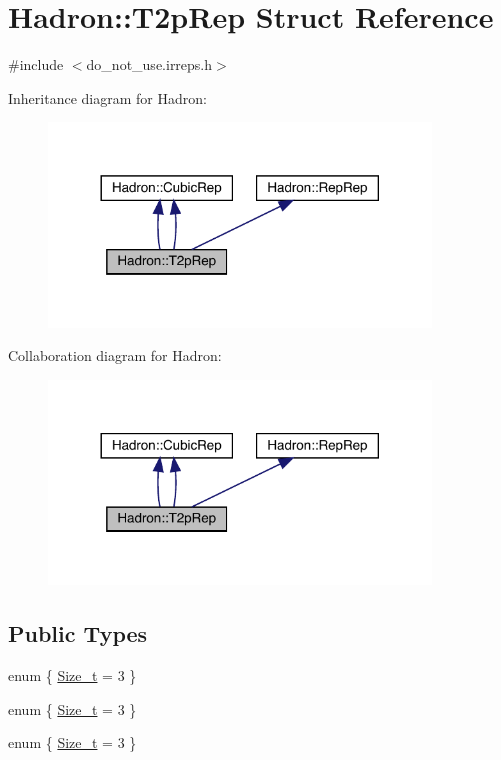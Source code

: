 \hypertarget{structHadron_1_1T2pRep}{}\section{Hadron\+:\+:T2p\+Rep Struct Reference}
\label{structHadron_1_1T2pRep}


{\ttfamily \#include $<$do\+\_\+not\+\_\+use.\+irreps.\+h$>$}



Inheritance diagram for Hadron\+:\nopagebreak
\begin{figure}[H]
\begin{center}
\leavevmode
\includegraphics[width=288pt]{dd/dbd/structHadron_1_1T2pRep__inherit__graph}
\end{center}
\end{figure}


Collaboration diagram for Hadron\+:\nopagebreak
\begin{figure}[H]
\begin{center}
\leavevmode
\includegraphics[width=288pt]{da/d97/structHadron_1_1T2pRep__coll__graph}
\end{center}
\end{figure}
\subsection*{Public Types}
\begin{DoxyCompactItemize}
\item 
enum \{ \mbox{\hyperlink{structHadron_1_1T2pRep_a2df836cd2e8ad1f9c1facd0d3ae1d332aa4ac0c05edb5f11de85bd33c675ea98c}{Size\+\_\+t}} = 3
 \}
\item 
enum \{ \mbox{\hyperlink{structHadron_1_1T2pRep_a2df836cd2e8ad1f9c1facd0d3ae1d332aa4ac0c05edb5f11de85bd33c675ea98c}{Size\+\_\+t}} = 3
 \}
\item 
enum \{ \mbox{\hyperlink{structHadron_1_1T2pRep_a2df836cd2e8ad1f9c1facd0d3ae1d332aa4ac0c05edb5f11de85bd33c675ea98c}{Size\+\_\+t}} = 3
 \}
\end{DoxyCompactItemize}
